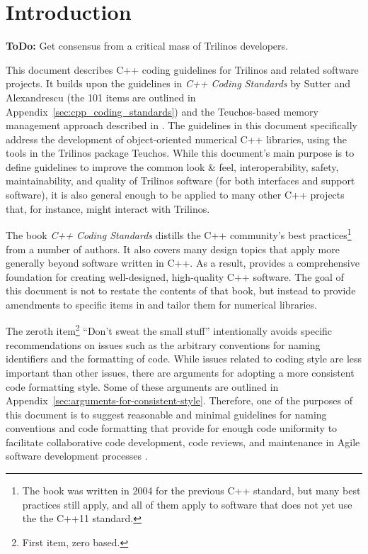 %
\section{Introduction}
%

{}\textbf{ToDo:} Get consensus from a critical mass of Trilinos
developers.

This document describes C++ coding guidelines for Trilinos and related
software projects.  It builds upon the guidelines in \emph{C++ Coding
Standards} by Sutter and Alexandrescu {}\cite{C++CodingStandards05}
(the 101 items are outlined in
Appendix~\ref{sec:cpp_coding_standards}) and the Teuchos-based memory
management approach described in
{}\cite{TeuchosMemoryManagementGuide}.  The guidelines in this
document specifically address the development of object-oriented
numerical C++ libraries, using the tools in the Trilinos package
Teuchos.  While this document's main purpose is to define guidelines
to improve the common look \& feel, interoperability, safety,
maintainability, and quality of Trilinos software (for both interfaces
and support software), it is also general enough to be applied to many
other C++ projects that, for instance, might interact with Trilinos.

The book \emph{C++ Coding Standards} {}\cite{C++CodingStandards05}
distills the C++ community's best practices\footnote{The book was
  written in 2004 for the previous C++ standard, but many best
  practices still apply, and all of them apply to software that does
  not yet use the the C++11 standard.} from a number of authors. It
also covers many design topics that apply more generally beyond
software written in C++.  As a result, {}\cite{C++CodingStandards05}
provides a comprehensive foundation for creating well-designed,
high-quality C++ software.  The goal of this document is not to
restate the contents of that book, but instead to provide amendments
to specific items in {}\cite{C++CodingStandards05} and tailor them for
numerical libraries.  

The zeroth item\footnote{First item, zero based.} ``Don't sweat the
small stuff'' intentionally avoids specific recommendations on issues
such as the arbitrary conventions for naming identifiers and the
formatting of code.  While issues related to coding style are less
important than other issues, there are arguments for adopting a more
consistent code formatting style.  Some of these arguments are
outlined in Appendix~\ref{sec:arguments-for-consistent-style}.
Therefore, one of the purposes of this document is to suggest
reasonable and minimal guidelines for naming conventions and code
formatting that provide for enough code uniformity to facilitate
collaborative code development, code reviews, and maintenance in Agile
software development processes
{}\cite{ExtremeProgrammingExplained2nd04}.

